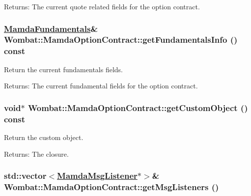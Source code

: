 \begin{Desc}
\item[Returns:]The current quote related fields for the option contract. \end{Desc}
\hypertarget{classWombat_1_1MamdaOptionContract_88dec6f0eef0533a71228f2c0be807c0}{
\subsubsection[getFundamentalsInfo]{\setlength{\rightskip}{0pt plus 5cm}\hyperlink{classWombat_1_1MamdaFundamentals}{Mamda\-Fundamentals}\& Wombat::Mamda\-Option\-Contract::get\-Fundamentals\-Info () const}}
\label{classWombat_1_1MamdaOptionContract_88dec6f0eef0533a71228f2c0be807c0}


Return the current fundamentals fields. 

\begin{Desc}
\item[Returns:]The current fundamental fields for the option contract. \end{Desc}
\hypertarget{classWombat_1_1MamdaOptionContract_b9989c238b0505570c490d69ada86630}{
\subsubsection[getCustomObject]{\setlength{\rightskip}{0pt plus 5cm}void$\ast$ Wombat::Mamda\-Option\-Contract::get\-Custom\-Object () const}}
\label{classWombat_1_1MamdaOptionContract_b9989c238b0505570c490d69ada86630}


Return the custom object. 

\begin{Desc}
\item[Returns:]The closure. \end{Desc}
\hypertarget{classWombat_1_1MamdaOptionContract_dda8149cad3a048b3ebf56f0f5fb0a1c}{
\subsubsection[getMsgListeners]{\setlength{\rightskip}{0pt plus 5cm}std::vector$<$\hyperlink{classWombat_1_1MamdaMsgListener}{Mamda\-Msg\-Listener}$\ast$$>$\& Wombat::Mamda\-Option\-Contract::get\-Msg\-Listeners ()}}
\label{classWombat_1_1MamdaOptionContract_dda8149cad3a048b3ebf56f0f5fb0a1c}


